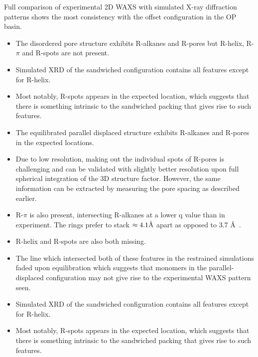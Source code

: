 \documentclass{article}
\newcommand{\angstrom}{\textup{\AA}}
\begin{document}
  Full comparison of experimental 2D WAXS with simulated X-ray diffraction
  patterns shows the most consistency with the offset configuration in the OP basin.
  \begin{itemize}
        \item The disordered pore structure exhibits R-alkanes and R-pores but R-helix,
	R-$\pi$ and R-spots are not present. 
        \item Simulated XRD of the sandwiched configuration contains all features 
        except for R-helix.
        \item Most notably, R-spots appears in the expected location, which suggests 
        that there is something intrinsic to the sandwiched packing that gives rise 
        to such features. 

	\item The equilibrated parallel displaced structure exhibits R-alkanes and
	R-pores in the expected locations. 
	\item Due to low resolution, making out the individual spots of R-pores is
	challenging and can be validated with slightly better resolution upon full
	spherical integration of the 3D structure factor. However, the same 
	information can be extracted by measuring the pore spacing as described earlier.
	\item R-$\pi$ is also present, intersecting R-alkanes at a lower q value than
	in experiment. The rings prefer to stack $\approx 4.1 \angstrom$ apart as 
	opposed to 3.7 \angstrom~.
	\item R-helix and R-spots are also both missing.
	\item The line which intersected both of these features in the restrained 
	simulations faded upon equilibration which suggests that monomers in the 
	parallel-displaced configuration may not give rise to the experimental WAXS 
	pattern seen.
	\item Simulated XRD of the sandwiched configuration contains all features 
	except for R-helix.
	\item Most notably, R-spots appears in the expected location, which suggests 
	that there is something intrinsic to the sandwiched packing that gives rise 
	to such features. 
  \end{itemize}
  
\end{document}
